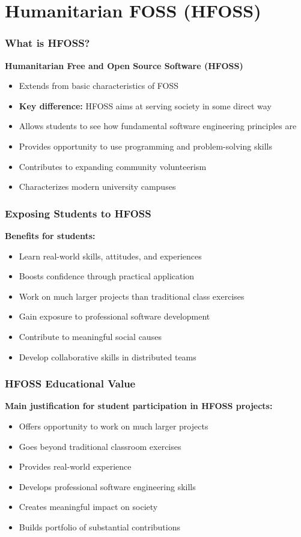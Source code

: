\documentclass[aspectratio=169]{beamer}
\begin{document}
\section{Humanitarian FOSS (HFOSS)}

\begin{frame}
\frametitle{What is HFOSS?}
\textbf{Humanitarian Free and Open Source Software (HFOSS)}

\begin{itemize}
\item Extends from basic characteristics of FOSS
\item \textbf{Key difference:} HFOSS aims at serving society in some direct way
\item Allows students to see how fundamental software engineering principles are
\item Provides opportunity to use programming and problem-solving skills
\item Contributes to expanding community volunteerism
\item Characterizes modern university campuses
\end{itemize}
\end{frame}

\begin{frame}
\frametitle{Exposing Students to HFOSS}
\textbf{Benefits for students:}
\begin{itemize}
\item Learn real-world skills, attitudes, and experiences
\item Boosts confidence through practical application
\item Work on much larger projects than traditional class exercises
\item Gain exposure to professional software development
\item Contribute to meaningful social causes
\item Develop collaborative skills in distributed teams
\end{itemize}
\end{frame}

\begin{frame}
\frametitle{HFOSS Educational Value}
\textbf{Main justification for student participation in HFOSS projects:}

\begin{itemize}
\item Offers opportunity to work on much larger projects
\item Goes beyond traditional classroom exercises
\item Provides real-world experience
\item Develops professional software engineering skills
\item Creates meaningful impact on society
\item Builds portfolio of substantial contributions
\end{itemize}
\end{frame}
\end{document}
